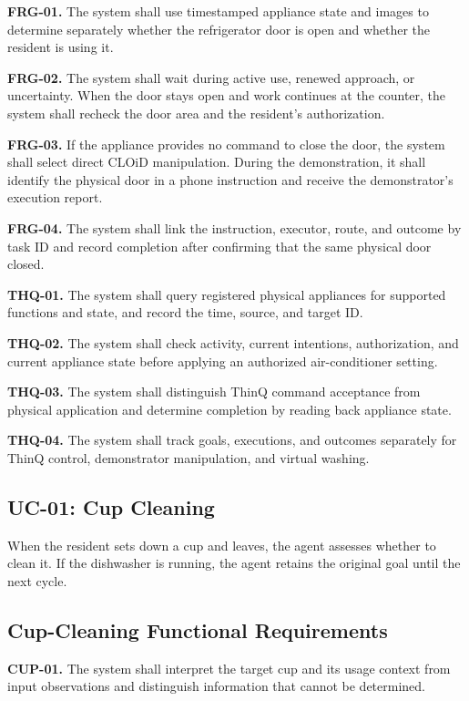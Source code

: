 \documentclass[conference,a4paper]{IEEEtran}
\newcommand{\req}[2]{\par\noindent\textbf{#1.} #2\par\smallskip}
\begin{document}
\req{FRG-01}{The system shall use timestamped appliance state and images to determine separately whether the refrigerator door is open and whether the resident is using it.}

\req{FRG-02}{The system shall wait during active use, renewed approach, or uncertainty. When the door stays open and work continues at the counter, the system shall recheck the door area and the resident's authorization.}

\req{FRG-03}{If the appliance provides no command to close the door, the system shall select direct CLOiD manipulation. During the demonstration, it shall identify the physical door in a phone instruction and receive the demonstrator's execution report.}

\req{FRG-04}{The system shall link the instruction, executor, route, and outcome by task ID and record completion after confirming that the same physical door closed.}

\req{THQ-01}{The system shall query registered physical appliances for supported functions and state, and record the time, source, and target ID.}

\req{THQ-02}{The system shall check activity, current intentions, authorization, and current appliance state before applying an authorized air-conditioner setting.}

\req{THQ-03}{The system shall distinguish ThinQ command acceptance from physical application and determine completion by reading back appliance state.}

\req{THQ-04}{The system shall track goals, executions, and outcomes separately for ThinQ control, demonstrator manipulation, and virtual washing.}

\subsection{UC-01: Cup Cleaning}

When the resident sets down a cup and leaves, the agent assesses whether to clean it. If the dishwasher is running, the agent retains the original goal until the next cycle.

\subsection{Cup-Cleaning Functional Requirements}

\req{CUP-01}{The system shall interpret the target cup and its usage context from input observations and distinguish information that cannot be determined.}
\end{document}
